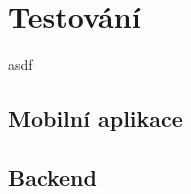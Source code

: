\chapter{Testování}

\begin{chapterabstract}
asdf
\end{chapterabstract}


\section{Mobilní aplikace}

\section{Backend}
